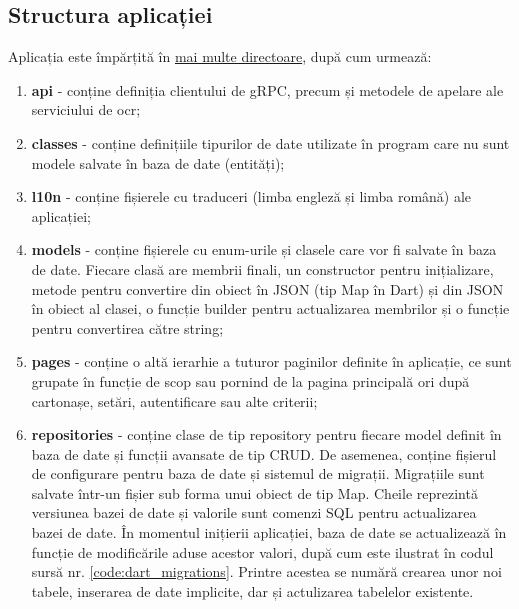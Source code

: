 \begin{code}
    \inputminted[frame=single,framesep=2mm,linenos,breaklines,tabsize=2]{dart}{code/dart-sqlite-special-cases.dart}
    \label{code:dart_sqlite_special_cases}
\end{code}

\subsection{Structura aplicației}

Aplicația este împărțită în \underline{mai multe directoare}, după cum urmează:

\begin{enumerate}
    \item \textbf{api} - conține definiția clientului de gRPC, precum și metodele de apelare ale serviciului de ocr;
    \item \textbf{classes} - conține definițiile tipurilor de date utilizate în program care nu sunt modele salvate în baza de date (entități);
    \item \textbf{l10n} - conține fișierele cu traduceri (limba engleză și limba română) ale aplicației;
    \item \textbf{models} - conține fișierele cu enum-urile și clasele care vor fi salvate în baza de date. Fiecare clasă are membrii finali, un constructor pentru inițializare, metode pentru convertire din obiect în JSON (tip Map în Dart) și din JSON în obiect al clasei, o funcție builder pentru actualizarea membrilor și o funcție pentru convertirea către string;
    \item \textbf{pages} - conține o altă ierarhie a tuturor paginilor definite în aplicație, ce sunt grupate în funcție de scop sau pornind de la pagina principală ori după cartonașe, setări, autentificare sau alte criterii;
    \item \textbf{repositories} - conține clase de tip repository pentru fiecare model definit în baza de date și funcții avansate de tip CRUD. De asemenea, conține fișierul de configurare pentru baza de date și sistemul de migrații. Migrațiile sunt salvate într-un fișier sub forma unui obiect de tip Map. Cheile reprezintă versiunea bazei de date și valorile sunt comenzi SQL pentru actualizarea bazei de date. În momentul inițierii aplicației, baza de date se actualizează în funcție de modificările aduse acestor valori, după cum este ilustrat în codul sursă nr. \ref{code:dart_migrations}. Printre acestea se numără crearea unor noi tabele, inserarea de date implicite, dar și actulizarea tabelelor existente.

\end{enumerate}
